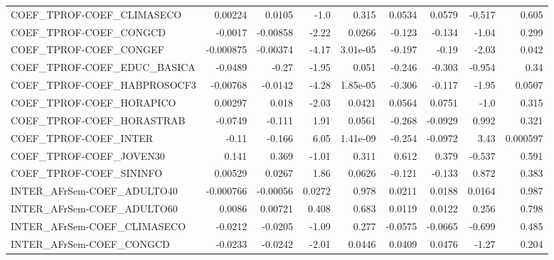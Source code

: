 \begin{tabular}{lrrrrrrrr}
COEF\_TPROF-COEF\_CLIMASECO             &     0.00224 &       0.0105 &     -1.0 &    0.315 &     0.0534 &      0.0579 &       -0.517 &         0.605 \\
COEF\_TPROF-COEF\_CONGCD                &     -0.0017 &     -0.00858 &    -2.22 &   0.0266 &     -0.123 &      -0.134 &        -1.04 &         0.299 \\
COEF\_TPROF-COEF\_CONGEF                &   -0.000875 &     -0.00374 &    -4.17 & 3.01e-05 &     -0.197 &       -0.19 &        -2.03 &         0.042 \\
COEF\_TPROF-COEF\_EDUC\_BASICA           &     -0.0489 &        -0.27 &    -1.95 &    0.051 &     -0.246 &      -0.303 &       -0.954 &          0.34 \\
COEF\_TPROF-COEF\_HABPROSOCF3           &    -0.00768 &      -0.0142 &    -4.28 & 1.85e-05 &     -0.306 &      -0.117 &        -1.95 &        0.0507 \\
COEF\_TPROF-COEF\_HORAPICO              &     0.00297 &        0.018 &    -2.03 &   0.0421 &     0.0564 &      0.0751 &         -1.0 &         0.315 \\
COEF\_TPROF-COEF\_HORASTRAB             &     -0.0749 &       -0.111 &     1.91 &   0.0561 &     -0.268 &     -0.0929 &        0.992 &         0.321 \\
COEF\_TPROF-COEF\_INTER                 &       -0.11 &       -0.166 &     6.05 & 1.41e-09 &     -0.254 &     -0.0972 &         3.43 &      0.000597 \\
COEF\_TPROF-COEF\_JOVEN30               &       0.141 &        0.369 &    -1.01 &    0.311 &      0.612 &       0.379 &       -0.537 &         0.591 \\
COEF\_TPROF-COEF\_SININFO               &     0.00529 &       0.0267 &     1.86 &   0.0626 &     -0.121 &      -0.133 &        0.872 &         0.383 \\
INTER\_AFrSem-COEF\_ADULTO40            &   -0.000766 &     -0.00056 &   0.0272 &    0.978 &     0.0211 &      0.0188 &       0.0164 &         0.987 \\
INTER\_AFrSem-COEF\_ADULTO60            &      0.0086 &      0.00721 &    0.408 &    0.683 &     0.0119 &      0.0122 &        0.256 &         0.798 \\
INTER\_AFrSem-COEF\_CLIMASECO           &     -0.0212 &      -0.0205 &    -1.09 &    0.277 &    -0.0575 &     -0.0665 &       -0.699 &         0.485 \\
INTER\_AFrSem-COEF\_CONGCD              &     -0.0233 &      -0.0242 &    -2.01 &   0.0446 &     0.0409 &      0.0476 &        -1.27 &         0.204 \\

\end{tabular}
